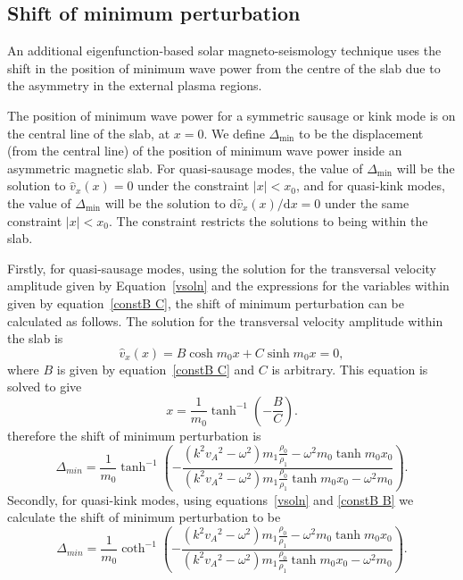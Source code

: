 \documentclass[namedreferences]{solarphysics}
\numberwithin{equation}{section}
\begin{document}
\begin{article}
\section{Shift of minimum perturbation}
An additional eigenfunction-based solar magneto-seismology technique uses the shift in the position of minimum wave power from the centre of the slab due to the asymmetry in the external plasma regions.

The position of minimum wave power for a symmetric sausage or kink mode is on the central line of the slab, at $x=0$. We define $\Delta_\textrm{min}$ to be the displacement (from the central line) of the position of minimum wave power inside an asymmetric magnetic slab. For quasi-sausage modes, the value of $\Delta_\textrm{min}$ will be the solution to $\widehat{v}_x(x) = 0$ under the constraint $|x| < x_0$, and for quasi-kink modes, the value of $\Delta_\textrm{min}$ will be the solution to $\textrm{d}\widehat{v}_x (x) / \textrm{d}x = 0$ under the same constraint $|x| < x_0$. The constraint restricts the solutions to being within the slab. 

Firstly, for quasi-sausage modes, using the solution for the transversal velocity amplitude given by Equation~\eqref{vsoln} and the expressions for the variables within given by equation~\eqref{constB C}, the shift of minimum perturbation can be calculated as follows. The solution for the transversal velocity amplitude within the slab is
\begin{equation}
\widehat{v}_x(x) = B\cosh{m_0x}+C\sinh{m_0x} = 0,
\end{equation}
where $B$ is given by equation~\eqref{constB C} and $C$ is arbitrary. This equation is solved to give
\begin{equation}
x = \frac{1}{m_0} \tanh^{-1}\left(-\frac{B}{C}\right). \label{disp of min power saus}
\end{equation}
therefore the shift of minimum perturbation is
\begin{equation}
\Delta_{min} = \frac{1}{m_0}\tanh^{-1}\left(-\frac{(k^2{v_A}^2-\omega^2)m_1\frac{\rho_0}{\rho_1} - \omega^2{m_0}\tanh{m_0x_0}}{(k^2{v_A}^2-\omega^2)m_1\frac{\rho_0}{\rho_1}\tanh{m_0x_0} - \omega^2{m_0}}\right). \label{shift min saus}
\end{equation}
Secondly, for quasi-kink modes, using equations~\eqref{vsoln} and \eqref{constB B} we calculate the shift of minimum perturbation to be
\begin{equation}
\Delta_{min} = \frac{1}{m_0}\coth^{-1}\left(-\frac{(k^2{v_A}^2-\omega^2)m_1\frac{\rho_0}{\rho_1} - \omega^2{m_0}\tanh{m_0x_0}}{(k^2{v_A}^2-\omega^2)m_1\frac{\rho_0}{\rho_1}\tanh{m_0x_0} - \omega^2{m_0}}\right). \label{shift min kink}
\end{equation}


\end{article}
\end{document}
